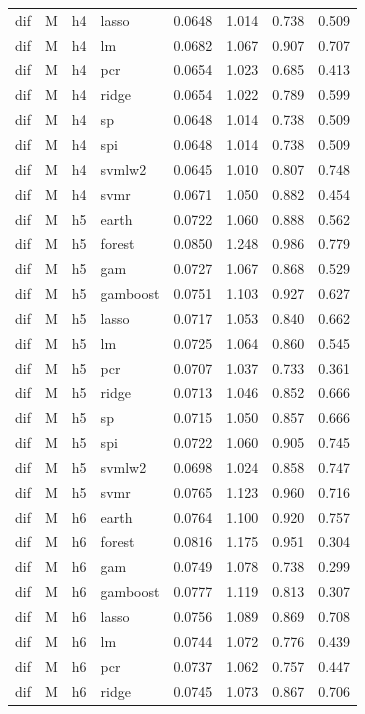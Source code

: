 \begin{ThreePartTable}
\begin{longtable}[t]{llclcccc}
dif & M & h4 & lasso & 0.0648 & 1.014 & 0.738 & 0.509\\
dif & M & h4 & lm & 0.0682 & 1.067 & 0.907 & 0.707\\
dif & M & h4 & pcr & 0.0654 & 1.023 & 0.685 & 0.413\\
dif & M & h4 & ridge & 0.0654 & 1.022 & 0.789 & 0.599\\
dif & M & h4 & sp & 0.0648 & 1.014 & 0.738 & 0.509\\
dif & M & h4 & spi & 0.0648 & 1.014 & 0.738 & 0.509\\
dif & M & h4 & svmlw2 & 0.0645 & 1.010 & 0.807 & 0.748\\
dif & M & h4 & svmr & 0.0671 & 1.050 & 0.882 & 0.454\\
\addlinespace
dif & M & h5 & earth & 0.0722 & 1.060 & 0.888 & 0.562\\
dif & M & h5 & forest & 0.0850 & 1.248 & 0.986 & 0.779\\
dif & M & h5 & gam & 0.0727 & 1.067 & 0.868 & 0.529\\
dif & M & h5 & gamboost & 0.0751 & 1.103 & 0.927 & 0.627\\
dif & M & h5 & lasso & 0.0717 & 1.053 & 0.840 & 0.662\\
dif & M & h5 & lm & 0.0725 & 1.064 & 0.860 & 0.545\\
dif & M & h5 & pcr & 0.0707 & 1.037 & 0.733 & 0.361\\
dif & M & h5 & ridge & 0.0713 & 1.046 & 0.852 & 0.666\\
dif & M & h5 & sp & 0.0715 & 1.050 & 0.857 & 0.666\\
dif & M & h5 & spi & 0.0722 & 1.060 & 0.905 & 0.745\\
dif & M & h5 & svmlw2 & 0.0698 & 1.024 & 0.858 & 0.747\\
dif & M & h5 & svmr & 0.0765 & 1.123 & 0.960 & 0.716\\
\addlinespace
dif & M & h6 & earth & 0.0764 & 1.100 & 0.920 & 0.757\\
dif & M & h6 & forest & 0.0816 & 1.175 & 0.951 & 0.304\\
dif & M & h6 & gam & 0.0749 & 1.078 & 0.738 & 0.299\\
dif & M & h6 & gamboost & 0.0777 & 1.119 & 0.813 & 0.307\\
dif & M & h6 & lasso & 0.0756 & 1.089 & 0.869 & 0.708\\
dif & M & h6 & lm & 0.0744 & 1.072 & 0.776 & 0.439\\
dif & M & h6 & pcr & 0.0737 & 1.062 & 0.757 & 0.447\\
dif & M & h6 & ridge & 0.0745 & 1.073 & 0.867 & 0.706\\

\end{longtable}
\end{ThreePartTable}
